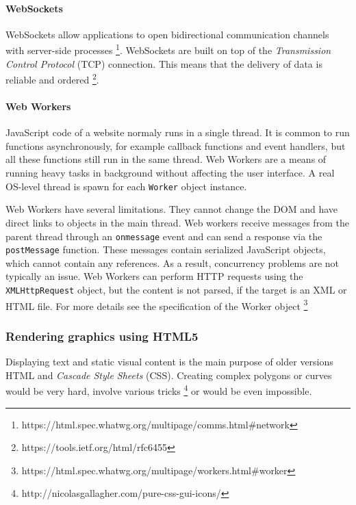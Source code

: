 \paragraph{WebSockets}
WebSockets allow applications to open bidirectional communication channels with server-side processes \cite{}\footnote{https://html.spec.whatwg.org/multipage/comms.html\#network}. WebSockets are built on top of the \textit{Transmission Control Protocol} (TCP) connection. This means that the delivery of data is reliable and ordered \cite{}\footnote{https://tools.ietf.org/html/rfc6455}.

\paragraph{Web Workers}
JavaScript code of a website normaly runs in a single thread. It is common to run functions asynchronously, for example callback functions and event handlers, but all these functions still run in the same thread. Web Workers are a means of running heavy tasks in background without affecting the user interface. A real OS-level thread is spawn for each \verb|Worker| object instance.

Web Workers have several limitations. They cannot change the DOM and have direct links to objects in the main thread. Web workers receive messages from the parent thread through an \verb|onmessage| event and can send a response via the \verb|postMessage| function. These messages contain serialized JavaScript objects, which cannot contain any references. As a result, concurrency problems are not typically an issue. Web Workers can perform HTTP requests using the \verb|XMLHttpRequest| object, but the content is not parsed, if the target is an XML or HTML file. For more details see the specification of the Worker object\cite{} \footnote{https://html.spec.whatwg.org/multipage/workers.html\#worker}





\subsubsection{Rendering graphics using HTML5}

Displaying text and static visual content is the main purpose of older versions HTML and \textit{Cascade Style Sheets} (CSS). Creating complex polygons or curves would be very hard, involve various tricks \footnote{http://nicolasgallagher.com/pure-css-gui-icons/} or would be even impossible. 


